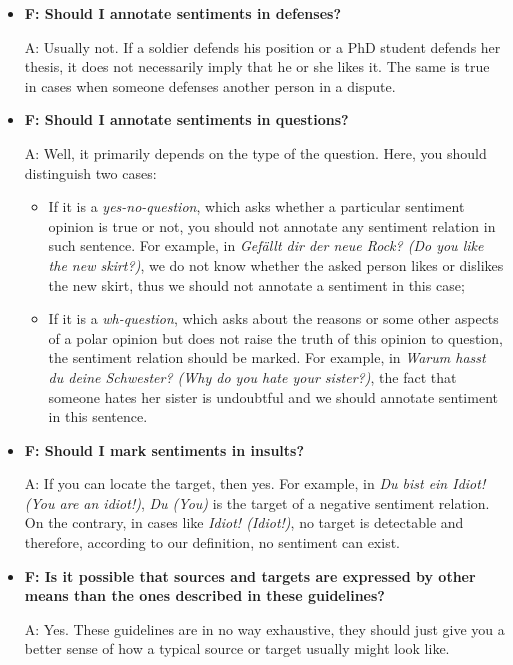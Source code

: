 \documentclass[11pt,a4paper]{article}
\begin{document}
\begin{itemize}
\item\textbf{F: Should I annotate sentiments in defenses?}

  A: Usually not.  If a soldier defends his position or a PhD student defends
  her thesis, it does not necessarily imply that he or she likes it.  The same
  is true in cases when someone defenses another person in a dispute.

\item\textbf{F: Should I annotate sentiments in questions?}

  A: Well, it primarily depends on the type of the question.  Here, you should
  distinguish two cases:
  \begin{itemize}
    \item If it is a \textit{yes-no-question}, which asks whether a particular
      sentiment opinion is true or not, you should not annotate any sentiment
      relation in such sentence.  For example, in \textit{Gef\"allt dir der
        neue Rock?  (Do you like the new skirt?)}, we do not know whether the
      asked person likes or dislikes the new skirt, thus we should not
      annotate a sentiment in this case;
    \item If it is a \textit{wh-question}, which asks about the reasons or
      some other aspects of a polar opinion but does not raise the truth of
      this opinion to question, the sentiment relation should be marked.  For
      example, in \textit{Warum hasst du deine Schwester? (Why do you hate
        your sister?)}, the fact that someone hates her sister is undoubtful
      and we should annotate sentiment in this sentence.
  \end{itemize}

\item\textbf{F: Should I mark sentiments in insults?}

  A: If you can locate the target, then yes.  For example, in \textit{Du bist
    ein Idiot! (You are an idiot!)}, \textit{Du (You)} is the target of a
  negative sentiment relation.  On the contrary, in cases like \textit{Idiot!
    (Idiot!)}, no target is detectable and therefore, according to our
  definition, no sentiment can exist.

\item\textbf{F: Is it possible that sources and targets are expressed by other
  means than the ones described in these guidelines?}

  A: Yes. These guidelines are in no way exhaustive, they should just give you
  a better sense of how a typical source or target usually might look like.


\end{itemize}
\end{document}
